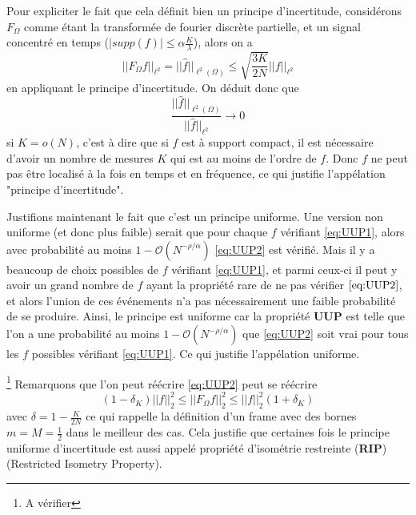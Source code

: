 \begin{remarque}
	Pour expliciter le fait que cela définit bien un principe d'incertitude, considérons $F_\Omega$ comme étant la transformée de fourier discrète partielle, et un signal concentré en temps ($|supp(f)| \leq \alpha \frac{K}{\lambda}$), alors on a 
	\begin{equation}
		||F_\Omega f||_{\ell^2} = ||\hat{f}||_{\ell^2(\Omega)} \leq \sqrt{\frac{3 K}{2N}}||f||_{\ell^2}
	\end{equation}
	en appliquant le principe d'incertitude.
	On déduit donc que 
	\begin{equation}
		\frac{ ||\hat{f}||_{\ell^2(\Omega)}}{||\hat{f}||_{\ell^2}} \longrightarrow 0
	\end{equation}
	si $K=o(N)$, c'est à dire que si $f$ est à support compact, il est nécessaire d'avoir un nombre de mesures $K$ qui est au moins de l'ordre de $f$.
	Donc $f$ ne peut pas être localisé à la fois en temps et en fréquence, ce qui justifie l'appélation "principe d'incertitude". 
\end{remarque}
\begin{remarque}
Justifions maintenant le fait que c'est un principe uniforme. 
	Une version non uniforme (et donc plus faible) serait que pour chaque $f$ vérifiant \ref{eq:UUP1}, alors avec probabilité au moins $1 -\mathcal{O}(N^{-\rho / \alpha})$  \ref{eq:UUP2} est vérifié. Mais il y a beaucoup de choix possibles de $f$ vérifiant \ref{eq:UUP1}, et parmi ceux-ci il peut y avoir un grand nombre de $f$ ayant la propriété rare de ne pas vérifier $\ref{eq:UUP2}$, et alors l'union de ces événements n'a pas nécessairement une faible probabilité de se produire.
	\newline
	Ainsi, le principe est uniforme car la propriété \textbf{UUP} est telle que l'on a une probabilité au moins $1- \mathcal{O}(N^{-\rho / \alpha})$ que \ref{eq:UUP2} soit vrai pour tous les $f$ possibles vérifiant \ref{eq:UUP1}. Ce qui justifie l'appélation uniforme.
\end{remarque}
\begin{remarque}\footnote{A vérifier}
	Remarquons que l'on peut réécrire \ref{eq:UUP2} peut se réécrire
	\begin{equation*}
		(1-\delta_K)||f||_2^2 \leq ||F_\Omega f||_2^2 \leq ||f||_2^2(1 + \delta_K)
	\end{equation*}
	avec $\delta = 1 - \frac{K}{2N}$ ce qui rappelle la définition d'un frame avec des bornes $m = M = \frac{1}{2}$ dans le meilleur des cas.
	Cela justifie que certaines fois le principe uniforme d'incertitude est aussi appelé propriété d'isométrie restreinte (\textbf{RIP}) (Restricted Isometry Property).
\end{remarque}
